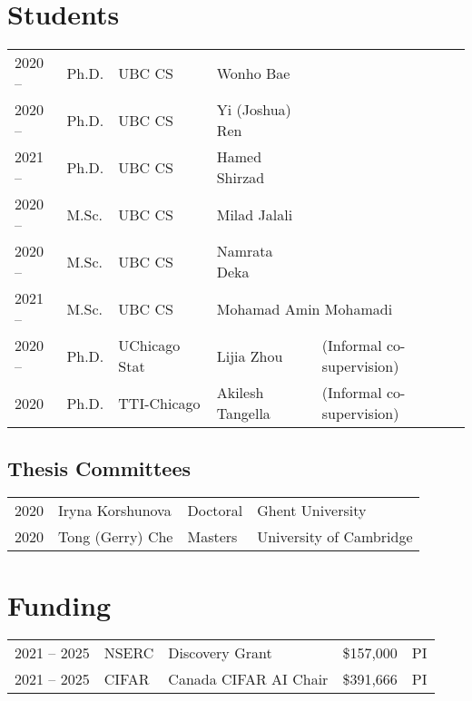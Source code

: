 \documentclass[11pt,sans]{moderncv}
\begin{document}
\section{Students}
\begin{tabular}{l@{\hskip .2in}l@{\hskip .2in}l@{\hskip .2in}l@{\hskip .2in}l}
    2020 -- & Ph.D. & UBC CS & Wonho Bae &\\
    2020 -- & Ph.D. & UBC CS & Yi (Joshua) Ren &\\
    2021 -- & Ph.D. & UBC CS & Hamed Shirzad &\\
    2020 -- & M.Sc. & UBC CS & Milad Jalali &\\
    2020 -- & M.Sc. & UBC CS & Namrata Deka &\\
    2021 -- & M.Sc. & UBC CS & \multicolumn{2}{l}{Mohamad Amin Mohamadi} \\
    2020 -- & Ph.D. & UChicago Stat & Lijia Zhou & (Informal co-supervision) \\
    2020 & Ph.D. & TTI-Chicago& Akilesh Tangella & (Informal co-supervision) \\
\end{tabular}

\subsection{Thesis Committees}
\begin{tabular}{l@{\hskip .2in}l@{\hskip .2in}l@{\hskip .2in}l}
    2020 & Iryna Korshunova & Doctoral & Ghent University \\
    2020 & Tong (Gerry) Che & Masters & University of Cambridge
\end{tabular}

\section{Funding}
\begin{tabular}{l@{\hskip .2in}l@{\hskip .2in}l@{\hskip .2in}l@{\hskip .2in}l}
  2021 -- 2025 & NSERC & Discovery Grant & \$157,000 & PI \\
  2021 -- 2025 & CIFAR & Canada CIFAR AI Chair & \$391,666 & PI \\
\end{tabular}

\clearpage  %
\end{document}
